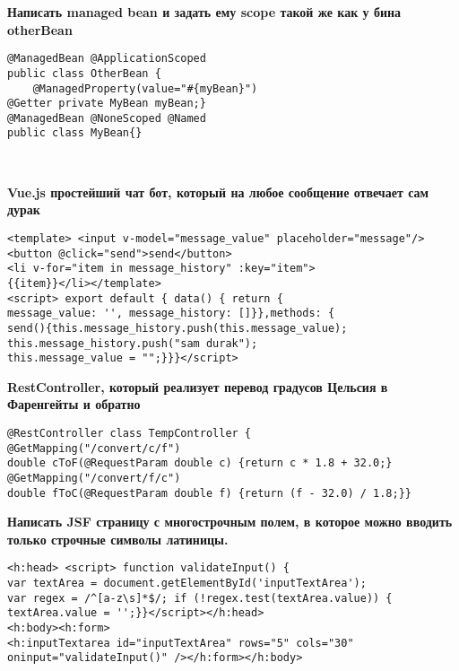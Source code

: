 \documentclass{article}
\begin{document}
\hfill
\begin{minipage}[t]{0.3\textwidth}
    \textbf{Написать managed bean и задать ему scope такой же как у бина otherBean}
    \begin{lstlisting}[frame=single, basicstyle=\tiny\ttfamily, breaklines=true, breakatwhitespace=true, postbreak=\mbox{\textcolor{red}{$\hookrightarrow$}\space}]
@ManagedBean @ApplicationScoped
public class OtherBean {
    @ManagedProperty(value="#{myBean}")
@Getter private MyBean myBean;}
@ManagedBean @NoneScoped @Named
public class MyBean{}
    \end{lstlisting}
\end{minipage}%
\\

\begin{minipage}[t]{0.3\textwidth}
    \textbf{Vue.js простейший чат бот, который на любое сообщение отвечает сам дурак}
    \begin{lstlisting}[frame=single, basicstyle=\tiny\ttfamily, breaklines=true, breakatwhitespace=true, postbreak=\mbox{\textcolor{red}{$\hookrightarrow$}\space}]
<template> <input v-model="message_value" placeholder="message"/> 
<button @click="send">send</button> 
<li v-for="item in message_history" :key="item"> 
{{item}}</li></template> 
<script> export default { data() { return { 
message_value: '', message_history: []}},methods: { 
send(){this.message_history.push(this.message_value); 
this.message_history.push("sam durak"); 
this.message_value = "";}}}</script>
    \end{lstlisting}
\end{minipage}%
\hfill
\begin{minipage}[t]{0.3\textwidth}
    \textbf{RestController, который реализует перевод градусов Цельсия в Фаренгейты и обратно}
    \begin{lstlisting}[frame=single, basicstyle=\tiny\ttfamily, breaklines=true, breakatwhitespace=true, postbreak=\mbox{\textcolor{red}{$\hookrightarrow$}\space}]
@RestController class TempController {
@GetMapping("/convert/c/f")
double cToF(@RequestParam double c) {return c * 1.8 + 32.0;}
@GetMapping("/convert/f/c")
double fToC(@RequestParam double f) {return (f - 32.0) / 1.8;}}
    \end{lstlisting}
\end{minipage}%
\hfill
\begin{minipage}[t]{0.3\textwidth}
    \textbf{Написать JSF страницу с многострочным полем, в которое можно вводить только строчные символы латиницы.}
    \begin{lstlisting}[frame=single, basicstyle=\tiny\ttfamily, breaklines=true, breakatwhitespace=true, postbreak=\mbox{\textcolor{red}{$\hookrightarrow$}\space}]
<h:head> <script> function validateInput() {
var textArea = document.getElementById('inputTextArea');
var regex = /^[a-z\s]*$/; if (!regex.test(textArea.value)) {
textArea.value = '';}}</script></h:head>
<h:body><h:form>
<h:inputTextarea id="inputTextArea" rows="5" cols="30" oninput="validateInput()" /></h:form></h:body>
    \end{lstlisting}
\end{minipage}%
\end{document}

